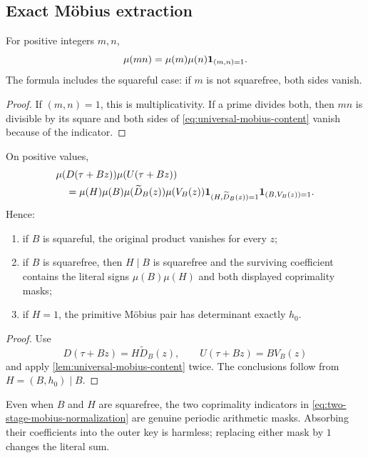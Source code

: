 \subsection{Exact M\"obius extraction}

\begin{lemma}
\label{lem:universal-mobius-content}
For positive integers \(m,n\),
\begin{equation}
 \mu(mn)
 =
 \mu(m)\mu(n)\mathbf 1_{(m,n)=1}.
\label{eq:universal-mobius-content}
\end{equation}
The formula includes the squareful case: if \(m\) is not squarefree,
both sides vanish.
\end{lemma}

\begin{proof}
If \((m,n)=1\), this is multiplicativity.  If a prime divides both,
then \(mn\) is divisible by its square and both sides of
\eqref{eq:universal-mobius-content} vanish because of the indicator.
\end{proof}

\begin{theorem}
\label{thm:two-stage-mobius-normalization}
On positive values,
\begin{align}
 &\mu(D(\tau+Bz))\mu(U(\tau+Bz))
\notag\\
 &\quad=
 \mu(H)\mu(B)
 \mu(\widetilde D_B(z))\mu(V_B(z))
 \mathbf 1_{(H,\widetilde D_B(z))=1}
 \mathbf 1_{(B,V_B(z))=1}.
\label{eq:two-stage-mobius-normalization}
\end{align}
Hence:
\begin{enumerate}[label=(\roman*),leftmargin=2.2em]
\item if \(B\) is squareful, the original product vanishes for every
  \(z\);
\item if \(B\) is squarefree, then \(H\mid B\) is squarefree and the
  surviving coefficient contains the literal signs
  \(\mu(B)\mu(H)\) and both displayed coprimality masks;
\item if \(H=1\), the primitive M\"obius pair has determinant exactly
  \(h_0\).
\end{enumerate}
\end{theorem}

\begin{proof}
Use
\[
 D(\tau+Bz)=H\widetilde D_B(z),\qquad
 U(\tau+Bz)=BV_B(z)
\]
and apply \cref{lem:universal-mobius-content} twice.  The conclusions
follow from \(H=(B,h_0)\mid B\).
\end{proof}

\begin{remark}
Even when \(B\) and \(H\) are squarefree, the two coprimality
indicators in \eqref{eq:two-stage-mobius-normalization} are genuine
periodic arithmetic masks.  Absorbing their coefficients into the
outer key is harmless; replacing either mask by \(1\) changes the
literal sum.
\end{remark}
